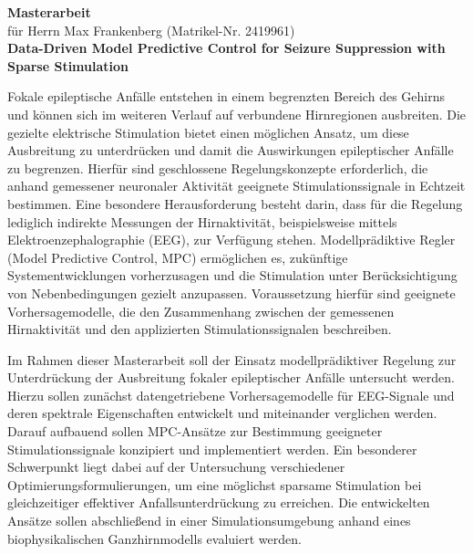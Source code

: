 \begin{center}
    \textbf{Masterarbeit} \\
    \vspace{11pt}
    für Herrn Max Frankenberg (Matrikel-Nr. 2419961) \\
    \vspace{11pt}
    \textbf{Data-Driven Model Predictive Control for Seizure Suppression with Sparse Stimulation} \\
\end{center}


Fokale epileptische Anfälle entstehen in einem begrenzten Bereich des Gehirns und können sich im weiteren Verlauf auf verbundene Hirnregionen ausbreiten. 
Die gezielte elektrische Stimulation bietet einen möglichen Ansatz, um diese Ausbreitung zu unterdrücken und damit die Auswirkungen epileptischer Anfälle zu begrenzen. 
Hierfür sind geschlossene Regelungskonzepte erforderlich, die anhand gemessener neuronaler Aktivität geeignete Stimulationssignale in Echtzeit bestimmen. 
Eine besondere Herausforderung besteht darin, dass für die Regelung lediglich indirekte Messungen der Hirnaktivität, beispielsweise mittels Elektroenzephalographie (EEG), zur Verfügung stehen. 
Modellprädiktive Regler (Model Predictive Control, MPC) ermöglichen es, zukünftige Systementwicklungen vorherzusagen und die Stimulation unter Berücksichtigung von Nebenbedingungen gezielt anzupassen. 
Voraussetzung hierfür sind geeignete Vorhersagemodelle, die den Zusammenhang zwischen der gemessenen Hirnaktivität und den applizierten Stimulationssignalen beschreiben.

Im Rahmen dieser Masterarbeit soll der Einsatz modellprädiktiver Regelung zur Unterdrückung der Ausbreitung fokaler epileptischer Anfälle untersucht werden. 
Hierzu sollen zunächst datengetriebene Vorhersagemodelle für EEG-Signale und deren spektrale Eigenschaften entwickelt und miteinander verglichen werden. 
Darauf aufbauend sollen MPC-Ansätze zur Bestimmung geeigneter Stimulationssignale konzipiert und implementiert werden. 
Ein besonderer Schwerpunkt liegt dabei auf der Untersuchung verschiedener Optimierungsformulierungen, um eine möglichst sparsame Stimulation bei gleichzeitiger effektiver Anfallsunterdrückung zu erreichen. 
Die entwickelten Ansätze sollen abschließend in einer Simulationsumgebung anhand eines biophysikalischen Ganzhirnmodells evaluiert werden.

